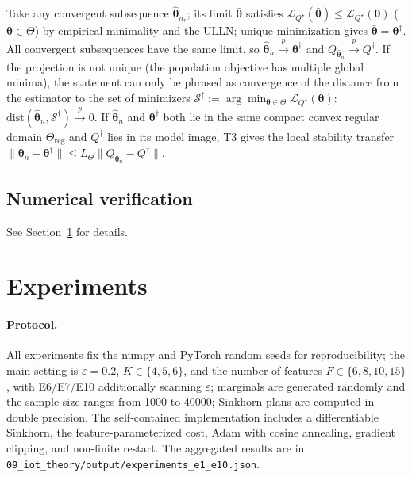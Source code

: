 \documentclass[11pt,a4paper]{article}
\theoremstyle{remark}
\begin{document}
Take any convergent subsequence $\widehat{\bm{\theta}}_{n_r}$; its limit
$\bar{\bm{\theta}}$ satisfies
$\mathcal{L}_{Q^{\star}}(\bar{\bm{\theta}})\le\mathcal{L}_{Q^{\star}}(\bm{\theta})$
($\bm{\theta}\in\Theta$) by empirical minimality and the ULLN; unique minimization gives
$\bar{\bm{\theta}}=\bm{\theta}^{\dagger}$. All convergent subsequences have the same limit,
so $\widehat{\bm{\theta}}_n\xrightarrow{p}\bm{\theta}^{\dagger}$ and
$Q_{\widehat{\bm{\theta}}_n}\xrightarrow{p}Q^{\dagger}$. If the projection is not unique
(the population objective has multiple global minima), the statement can only be phrased as
convergence of the distance from the estimator to the set of minimizers
$\mathcal{S}^{\dagger}:=\arg\min_{\bm{\theta}\in\Theta}\mathcal{L}_{Q^{\star}}(\bm{\theta})$:
$\mathrm{dist}(\widehat{\bm{\theta}}_n,\mathcal{S}^{\dagger})\xrightarrow{p}0$. If
$\widehat{\bm{\theta}}_n$ and $\bm{\theta}^{\dagger}$ both lie in the same compact convex
regular domain $\Theta_{\mathrm{reg}}$ and $Q^{\dagger}$ lies in its model image, T3 gives
the local stability transfer
$\|\widehat{\bm{\theta}}_n-\bm{\theta}^{\dagger}\|\le L_\Theta\|Q_{\widehat{\bm{\theta}}_n}-Q^{\dagger}\|$.

\subsection{Numerical verification}

See Section~\ref{sec:exp} for details.

\section{Experiments}\label{sec:exp}

\paragraph{Protocol.}
All experiments fix the numpy and PyTorch random seeds for reproducibility; the main
setting is $\varepsilon=0.2$, $K\in\{4,5,6\}$, and the number of features
$F\in\{6,8,10,15\}$, with E6/E7/E10 additionally scanning $\varepsilon$; marginals are
generated randomly and the sample size ranges from 1000 to 40000; Sinkhorn plans are
computed in double precision. The self-contained implementation includes a differentiable
Sinkhorn, the feature-parameterized cost, Adam with cosine annealing, gradient clipping,
and non-finite restart. The aggregated results are in
\texttt{09\_iot\_theory/output/experiments\_e1\_e10.json}.
\end{document}
